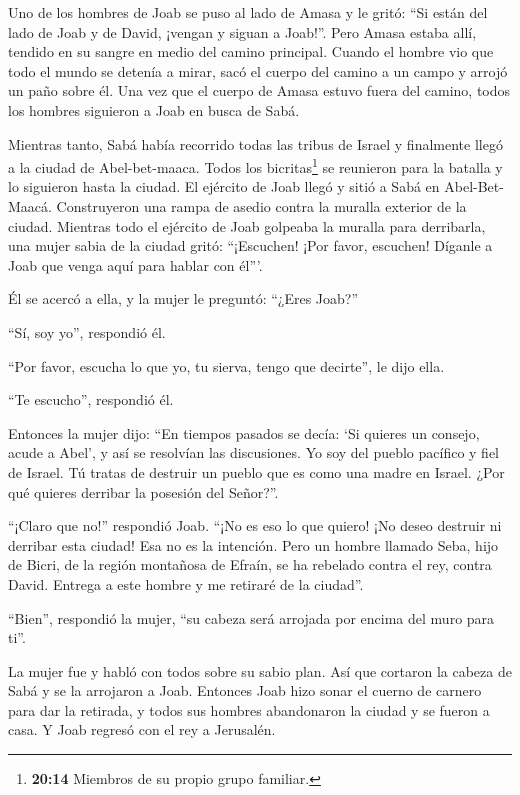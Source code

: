  Uno de los hombres de Joab se puso al lado de Amasa y le
gritó: ``Si están del lado de Joab y de David, ¡vengan y siguan a
Joab!''.  Pero Amasa estaba allí, tendido en su sangre en
medio del camino principal. Cuando el hombre vio que todo el mundo se
detenía a mirar, sacó el cuerpo del camino a un campo y arrojó un paño
sobre él.  Una vez que el cuerpo de Amasa estuvo fuera del
camino, todos los hombres siguieron a Joab en busca de Sabá.

 Mientras tanto, Sabá había recorrido todas las tribus de
Israel y finalmente llegó a la ciudad de Abel-bet-maaca. Todos los
bicritas\footnote{\textbf{20:14} Miembros de su propio grupo familiar.}
se reunieron para la batalla y lo siguieron hasta la ciudad.
 El ejército de Joab llegó y sitió a Sabá en
Abel-Bet-Maacá. Construyeron una rampa de asedio contra la muralla
exterior de la ciudad. Mientras todo el ejército de Joab golpeaba la
muralla para derribarla,  una mujer sabia de la ciudad
gritó: ``¡Escuchen! ¡Por favor, escuchen! Díganle a Joab que venga aquí
para hablar con él'''.

 Él se acercó a ella, y la mujer le preguntó: ``¿Eres
Joab?''

``Sí, soy yo'', respondió él.

``Por favor, escucha lo que yo, tu sierva, tengo que decirte'', le dijo
ella.

``Te escucho'', respondió él.

 Entonces la mujer dijo: ``En tiempos pasados se decía: `Si
quieres un consejo, acude a Abel', y así se resolvían las discusiones.
 Yo soy del pueblo pacífico y fiel de Israel. Tú tratas de
destruir un pueblo que es como una madre en Israel. ¿Por qué quieres
derribar la posesión del Señor?''.

 ``¡Claro que no!'' respondió Joab. ``¡No es eso lo que
quiero! ¡No deseo destruir ni derribar esta ciudad!  Esa no
es la intención. Pero un hombre llamado Seba, hijo de Bicri, de la
región montañosa de Efraín, se ha rebelado contra el rey, contra David.
Entrega a este hombre y me retiraré de la ciudad''.

``Bien'', respondió la mujer, ``su cabeza será arrojada por encima del
muro para ti''.

 La mujer fue y habló con todos sobre su sabio plan. Así
que cortaron la cabeza de Sabá y se la arrojaron a Joab. Entonces Joab
hizo sonar el cuerno de carnero para dar la retirada, y todos sus
hombres abandonaron la ciudad y se fueron a casa. Y Joab regresó con el
rey a Jerusalén.

